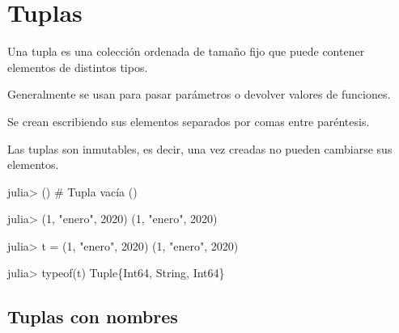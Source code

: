 \documentclass[
  letterpaper,
  DIV=11,
  numbers=noendperiod]{scrreprt}
\newenvironment{Shaded}{\begin{snugshade}}{\end{snugshade}}
\newcommand{\CommentTok}[1]{\textcolor[rgb]{0.37,0.37,0.37}{#1}}
\newcommand{\DataTypeTok}[1]{\textcolor[rgb]{0.68,0.00,0.00}{#1}}
\newcommand{\FloatTok}[1]{\textcolor[rgb]{0.68,0.00,0.00}{#1}}
\newcommand{\FunctionTok}[1]{\textcolor[rgb]{0.28,0.35,0.67}{#1}}
\newcommand{\NormalTok}[1]{\textcolor[rgb]{0.00,0.23,0.31}{#1}}
\newcommand{\OperatorTok}[1]{\textcolor[rgb]{0.37,0.37,0.37}{#1}}
\newcommand{\StringTok}[1]{\textcolor[rgb]{0.13,0.47,0.30}{#1}}
\begin{document}
\hypertarget{tuplas}{%
\section{Tuplas}\label{tuplas}}

Una tupla es una colección ordenada de tamaño fijo que puede contener
elementos de distintos tipos.

Generalmente se usan para pasar parámetros o devolver valores de
funciones.

Se crean escribiendo sus elementos separados por comas entre paréntesis.

\begin{tcolorbox}[enhanced jigsaw, colbacktitle=quarto-callout-warning-color!10!white, coltitle=black, opacityback=0, opacitybacktitle=0.6, bottomtitle=1mm, leftrule=.75mm, toprule=.15mm, bottomrule=.15mm, toptitle=1mm, breakable, colframe=quarto-callout-warning-color-frame, colback=white, rightrule=.15mm, titlerule=0mm, title=\textcolor{quarto-callout-warning-color}{\faExclamationTriangle}\hspace{0.5em}{Warning}, arc=.35mm, left=2mm]
Las tuplas son inmutables, es decir, una vez creadas no pueden cambiarse
sus elementos.
\end{tcolorbox}

\begin{Shaded}
\begin{Highlighting}[]
\NormalTok{julia}\OperatorTok{\textgreater{}}\NormalTok{ ()  }\CommentTok{\# Tupla vacía}
\NormalTok{()}

\NormalTok{julia}\OperatorTok{\textgreater{}}\NormalTok{ (}\FloatTok{1}\NormalTok{, }\StringTok{"enero"}\NormalTok{, }\FloatTok{2020}\NormalTok{) }
\NormalTok{(}\FloatTok{1}\NormalTok{, }\StringTok{"enero"}\NormalTok{, }\FloatTok{2020}\NormalTok{)}

\NormalTok{julia}\OperatorTok{\textgreater{}}\NormalTok{ t }\OperatorTok{=}\NormalTok{ (}\FloatTok{1}\NormalTok{, }\StringTok{"enero"}\NormalTok{, }\FloatTok{2020}\NormalTok{)}
\NormalTok{(}\FloatTok{1}\NormalTok{, }\StringTok{"enero"}\NormalTok{, }\FloatTok{2020}\NormalTok{)}

\NormalTok{julia}\OperatorTok{\textgreater{}} \FunctionTok{typeof}\NormalTok{(t)}
\DataTypeTok{Tuple}\NormalTok{\{}\DataTypeTok{Int64}\NormalTok{, }\DataTypeTok{String}\NormalTok{, }\DataTypeTok{Int64}\NormalTok{\}}
\end{Highlighting}
\end{Shaded}

\hypertarget{tuplas-con-nombres}{%
\subsection{Tuplas con nombres}\label{tuplas-con-nombres}}
\end{document}
